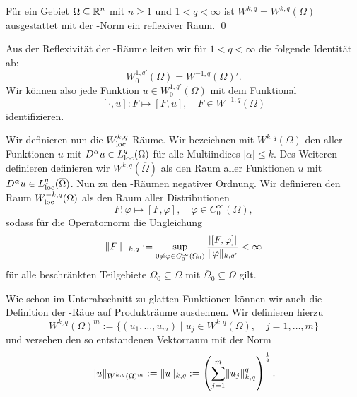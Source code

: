 \begin{lem}
  Für ein Gebiet $\Omega \subseteq \mathbb{R}^n$ mit $n \geq 1$ und $1 < q < \infty$ ist $W^{k,q} = W^{k,q}(\Omega)$ ausgestattet mit der \sobolev\hyp{}Norm ein reflexiver Raum. \qed
\end{lem}

Aus der Reflexivität der \sobolev\hyp{}Räume leiten wir für $1 < q < \infty$ die folgende Identität ab:
$$
  W_0^{1,q'}(\Omega) = W^{-1,q}(\Omega)'.
$$
Wir können also jede Funktion $u \in W_0^{1,q'}(\Omega)$ mit dem Funktional
$$
[\cdot, u] \colon F \mapsto [F, u], \quad F \in W^{-1,q}(\Omega)
$$
identifizieren.

Wir definieren nun die $W^{k,q}_{\operatorname{loc}}$\hyp{}Räume.
Wir bezeichnen mit $W^{k,q}(\Omega)$ den aller Funktionen $u$ mit $D^\alpha u \in L^q_{\operatorname{loc}}(\Omega)$ für alle Multiindices $|\alpha| \leq k$.
Des Weiteren definieren definieren wir $W^{k,q}(\overline\Omega)$ als den Raum aller Funktionen $u$ mit $D^\alpha u \in L^q_{\operatorname{loc}}(\overline\Omega)$.
Nun zu den \sobolev\hyp{}Räumen negativer Ordnung. 
Wir definieren den Raum $W^{-k,q}_{\operatorname{loc}}(\Omega)$ als den Raum aller Distributionen
$$
F \colon \varphi \mapsto [F,\varphi], \quad \varphi \in C_0^\infty(\Omega),
$$
sodass für die Operatornorm die Ungleichung
$$
\lVert F \rVert_{-k,q} := \sup_{0 \neq \varphi \in C_0^\infty(\Omega_0)}  \frac{|[F,\varphi]|}{\lVert \varphi \rVert_{k,q'}} < \infty
$$
für alle beschränkten Teilgebiete $\Omega_0 \subseteq \Omega$ mit $\overline\Omega_0 \subseteq \Omega$ gilt.

Wie schon im Unterabschnitt zu glatten Funktionen können wir auch die Definition der \sobolev\hyp{}Räue auf Produkträume ausdehnen. 
Wir definieren hierzu
$$
W^{k,q}(\Omega)^m := \{ (u_1,\dots,u_m) \mid u_j \in W^{k,q}(\Omega), \quad j = 1,\dots, m\}
$$
und versehen den so entstandenen Vektorraum mit der Norm
$$
\lVert u \rVert_{W^{k,q}(\Omega)^m} 
:= \lVert u \rVert_{k,q}
:= \left( \sum_{j = 1}^m \lVert u_j \rVert_{k,q}^q \right)^{\frac{1}{q}}.
$$

